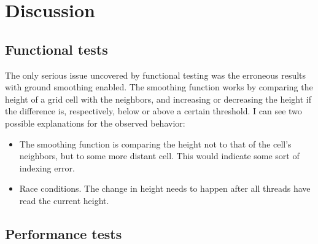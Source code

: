 \section{Discussion}
\subsection{Functional tests}
The only serious issue uncovered by functional testing was the erroneous results with ground smoothing enabled. The smoothing function works by comparing the height of a grid cell with the neighbors, and increasing or decreasing the height if the difference is, respectively, below or above a certain threshold. I can see two possible explanations for the observed behavior:
\begin{itemize}
\item The smoothing function is comparing the height not to that of the cell's neighbors, but to some more distant cell. This would indicate some sort of indexing error.
\item Race conditions. The change in height needs to happen after all threads have read the current height.
\end{itemize}

\subsection{Performance tests}